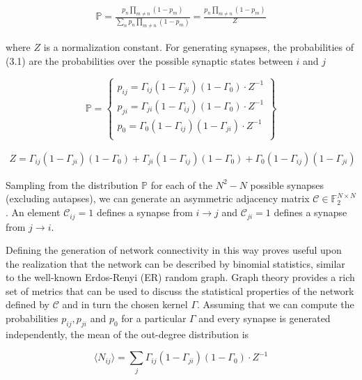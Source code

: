\documentclass{ucetd}
\begin{document}
\begin{align}
\mathbb{P} = \frac{p_{n}\prod_{m\neq n}(1-p_{m})}{\sum_{n}p_{n}\prod_{m\neq n}(1-p_{m})} = \frac{p_{n}\prod_{m\neq n}(1-p_{m})}{Z}
\end{align}

where $Z$ is a normalization constant. For generating synapses, the probabilities of (3.1) are the probabilities over the possible synaptic states between $i$ and $j$

\begin{equation}
    \mathbb{P} = \left\{\begin{array}{lr}
        p_{ij} = \Gamma_{ij}(1-\Gamma_{ji})(1-\Gamma_{0})\cdot Z^{-1}\\
        p_{ji} = \Gamma_{ji}(1-\Gamma_{ij})(1-\Gamma_{0})\cdot Z^{-1}\\
        p_{0} = \Gamma_{0}(1-\Gamma_{ij})(1-\Gamma_{ji})\cdot Z^{-1}\\
        \end{array}\right\}
\end{equation}
  
\begin{align*}
Z = \Gamma_{ij}(1-\Gamma_{ji})(1-\Gamma_{0}) + \Gamma_{ji}(1-\Gamma_{ij})(1-\Gamma_{0}) + \Gamma_{0}(1-\Gamma_{ij})(1-\Gamma_{ji})
\end{align*}

Sampling from the distribution $\mathbb{P}$ for each of the $N^{2} - N$ possible synapses (excluding autapses), we can generate an asymmetric adjacency matrix $\mathcal{C} \in \mathbb{F}_{2}^{N\times N}$. An element $\mathcal{C}_{ij} = 1$ defines a synapse from $i\rightarrow j$ and $\mathcal{C}_{ji} = 1$ defines a synapse from $j\rightarrow i$.

Defining the generation of network connectivity in this way proves useful upon the realization that the network can be described by binomial statistics, similar to the well-known Erdos-Renyi (ER) random graph. Graph theory provides a rich set of metrics that can be used to discuss the statistical properties of the network defined by $\mathcal{C}$ and in turn the chosen kernel $\Gamma$. Assuming that we can compute the probabilities $p_{ij}, p_{ji}$ and $p_{0}$ for a particular $\Gamma$ and every synapse is generated independently, the mean of the out-degree distribution is

\begin{equation}
\langle N_{ij} \rangle = \sum_{j} \Gamma_{ij}(1-\Gamma_{ji})(1-\Gamma_{0})\cdot Z^{-1}
\end{equation}
\end{document}
